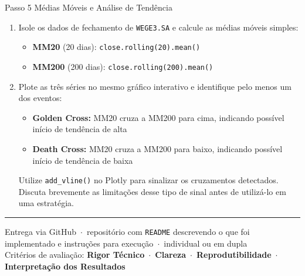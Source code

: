 \documentclass[11pt,a4paper]{article}
\newcommand{\code}[1]{%
  \colorbox{quantlightgray}{\texttt{\small\color{quantdark}#1}}%
}
\begin{document}
\begin{stepbox}{Passo 5 \quad Médias Móveis e Análise de Tendência}
\begin{enumerate}
  \item Isole os dados de fechamento de \code{WEGE3.SA} e calcule as médias móveis simples:
        \begin{itemize}
          \item \textbf{MM20} (20 dias): \code{close.rolling(20).mean()}
          \item \textbf{MM200} (200 dias): \code{close.rolling(200).mean()}
        \end{itemize}

  \item Plote as três séries no mesmo gráfico interativo e identifique pelo menos um dos eventos:
        \begin{itemize}
          \item \textbf{\textcolor{quantgreen}{Golden Cross:}} MM20 cruza a MM200 para cima,
                indicando possível início de tendência de alta
          \item \textbf{\textcolor{quantred}{Death Cross:}} MM20 cruza a MM200 para baixo,
                indicando possível início de tendência de baixa
        \end{itemize}

        Utilize \code{add\_vline()} no Plotly para sinalizar os cruzamentos detectados.
        Discuta brevemente as limitações desse tipo de sinal antes de utilizá-lo em uma estratégia.
\end{enumerate}
\end{stepbox}

\vspace{1.8em}

\textcolor{quantpurple}{\rule{\textwidth}{1.2pt}}

\vspace{0.6em}
\begin{center}
  \textcolor{quantgray}{\small
    Entrega via GitHub \,$\cdot$\, repositório com \texttt{README} descrevendo o que foi
    implementado e instruções para execução \,$\cdot$\, individual ou em dupla
  }\\[5pt]
  \textcolor{quantgray}{\small
    Critérios de avaliação:\;
    \textbf{Rigor Técnico} \,$\cdot$\,
    \textbf{Clareza} \,$\cdot$\,
    \textbf{Reprodutibilidade} \,$\cdot$\,
    \textbf{Interpretação dos Resultados}
  }
\end{center}
\end{document}
